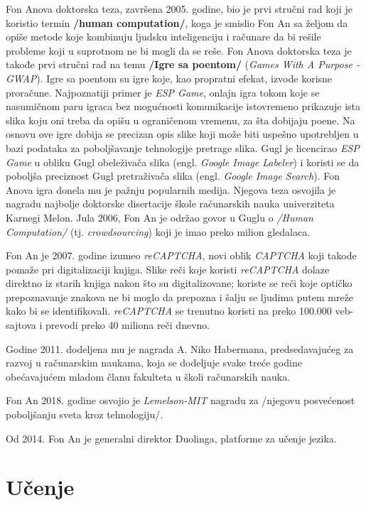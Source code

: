 \documentclass[titlepage, 12pt]{article}
\begin{document}
Fon Anova doktorska teza, završena 2005. godine, bio je prvi stručni rad koji je koristio termin \textbf{/human computation/}, koga je smislio Fon An sa željom da opiše metode koje kombinuju ljudsku inteligenciju i računare da bi rešile probleme koji u suprotnom ne bi mogli da se reše. Fon Anova doktorska teza je takođe prvi stručni rad na temu \textbf{/Igre sa poentom/} (\textit{Games With A Purpose - GWAP}). Igre sa poentom su igre koje, kao propratni efekat, izvode korisne proračune. Najpoznatiji primer je \textit{ESP Game}, onlajn igra tokom koje se nasumičnom paru igraca bez mogućnosti komunikacije istovremeno prikazuje ista slika koju oni treba da opišu u ograničenom vremenu, za šta dobijaju poene. Na osnovu ove igre dobija se precizan opis slike koji može biti uspešno upotrebljen u bazi podataka za poboljšavanje tehnologije pretrage slika. Gugl je licencirao \textit{ESP Game} u obliku Gugl obeleživača slika (engl. \textit{Google Image Labeler}) i koristi se da poboljša preciznost Gugl pretraživača slika (engl. \textit{Google Image Search}). Fon Anova igra donela mu je pažnju popularnih medija. Njegova teza osvojila je nagradu najbolje doktorske disertacije škole računarskih nauka univerziteta Karnegi Melon. Jula 2006, Fon An je održao govor u Guglu o \textit{/Human Computation/} (tj. \textit{crowdsourcing}) koji je imao preko milion gledalaca.


Fon An je 2007. godine izumeo \textit{reCAPTCHA}, novi oblik \textit{CAPTCHA} koji takode pomaže pri digitalizaciji knjiga. Slike reči koje koristi \textit{reCAPTCHA} dolaze direktno iz starih knjiga nakon što su digitalizovane; koriste se reči koje optičko prepoznavanje znakova ne bi moglo da prepozna i šalju se ljudima putem mreže kako bi se identifikovali. \textit{reCAPTCHA} se trenutno koristi na preko 100.000 veb-sajtova i prevodi preko 40 miliona reči dnevno.

Godine 2011. dodeljena mu je nagrada A. Niko Habermana, predsedavajućeg za razvoj u računarskim naukama, koja se dodeljuje svake treće godine obećavajućem mladom članu fakulteta u školi računarskih nauka.

Fon An 2018. godine osvojio je \textit{Lemelson-MIT} nagradu za /njegovu posvećenost poboljšanju sveta kroz tehnologiju/.

Od 2014. Fon An je generalni direktor Duolinga, platforme za učenje jezika.


\section{Učenje}
\end{document}
